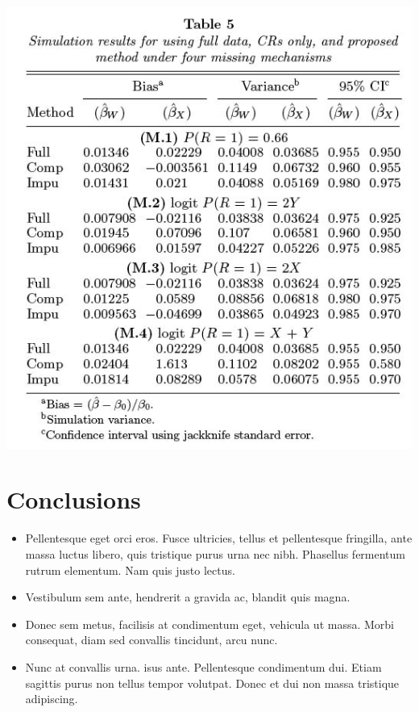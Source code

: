 \documentclass[a1,portrait]{a1poster}
\begin{document}
\begin{multicols}{2}
\begin{center}\vspace{1cm}
\includegraphics[width=0.5\linewidth]{paik_tab5}
\end{center}\vspace{1cm}


\color{FireBrick} %

\section*{Conclusions}

\begin{itemize}
\item Pellentesque eget orci eros. Fusce ultricies, tellus et pellentesque fringilla, ante massa luctus libero, quis tristique purus urna nec nibh. Phasellus fermentum rutrum elementum. Nam quis justo lectus.
\item Vestibulum sem ante, hendrerit a gravida ac, blandit quis magna.
\item Donec sem metus, facilisis at condimentum eget, vehicula ut massa. Morbi consequat, diam sed convallis tincidunt, arcu nunc.
\item Nunc at convallis urna. isus ante. Pellentesque condimentum dui. Etiam sagittis purus non tellus tempor volutpat. Donec et dui non massa tristique adipiscing.
\end{itemize}


\end{multicols}
\end{document}
